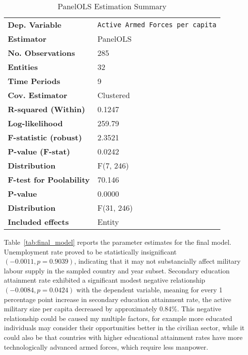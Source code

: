 \begin{table}[htbp]
\centering
\begin{threeparttable}
\caption{PanelOLS Estimation Summary}
\label{tab:panelols_summary}
\begin{tabularx}{\textwidth}{@{}lX@{}}
\toprule
\textbf{Dep. Variable} & \texttt{Active Armed Forces per capita} \\
\textbf{Estimator} & PanelOLS \\
\textbf{No. Observations} & 285 \\
\textbf{Entities} & 32 \\
\textbf{Time Periods} & 9 \\
\textbf{Cov. Estimator} & Clustered \\
\midrule
\textbf{R-squared (Within)} & 0.1247 \\
\textbf{Log-likelihood} & 259.79 \\
\textbf{F-statistic (robust)} & 2.3521 \\
\textbf{P-value (F-stat)} & 0.0242 \\
\textbf{Distribution} & F(7, 246) \\
\midrule
\textbf{F-test for Poolability} & 70.146 \\
\textbf{P-value} & 0.0000 \\
\textbf{Distribution} & F(31, 246) \\
\textbf{Included effects} & Entity \\
\bottomrule
\end{tabularx}
\end{threeparttable}
\label{tab:model_summary}
\end{table}

Table~\ref{tab:final_model} reports the parameter estimates for the final model. 
Unemployment rate proved to be statistically insignificant $(-0.0011, p=0.9039)$, 
indicating that it may not substancially affect military labour supply in the sampled country and year subset.
Secondary education attainment rate exhibited a significant modest negative relationship $(-0.0084, p=0.0424)$ 
with the dependent variable, meaning for every 1 percentage point increase in secondary education 
attainment rate, the active military size per capita decreased by approximately 0.84\%.
This negative relationship could be caused my multiple factors, for example more educated individuals 
may consider their opportunities better in the civilian sector, while it could also be that countries 
with higher educational attainment rates have more technologically advanced armed forces, which require 
less manpower.

